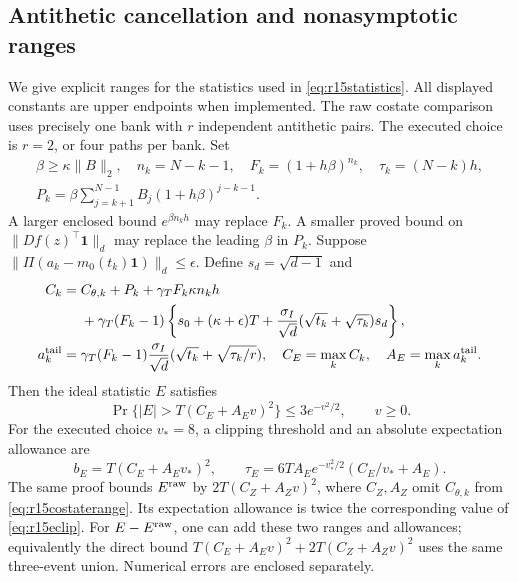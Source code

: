 \subsection{Antithetic cancellation and nonasymptotic ranges}
We give explicit ranges for the statistics used in
\eqref{eq:r15statistics}. All displayed constants are upper endpoints
when implemented. The raw costate comparison uses precisely one bank
with $r$ independent antithetic pairs. The executed choice is $r=2$,
or four paths per bank. Set
\[
 \begin{gathered}
 \beta\geq\kappa\|B\|_2,\quad n_k=N-k-1,\quad
 F_k=(1+h\beta)^{n_k},\quad\tau_k=(N-k)h,\\
 P_k=\beta\sum_{j=k+1}^{N-1}B_j(1+h\beta)^{j-k-1}.
 \end{gathered}
\]
A larger enclosed bound $e^{\beta n_kh}$ may replace $F_k$.
A smaller proved bound on $\|Df(z)^\top\bm1\|_d$ may replace the
leading $\beta$ in $P_k$. Suppose
$\|\Pi(a_k-m_0(t_k)\bm1)\|_d\leq\epsilon$.
Define $s_d=\sqrt{d-1}$ and
\begin{align}
 C_k={}&C_{\theta,k}+P_k+\gamma_TF_k\kappa n_kh\notag\\
 &+\gamma_T(F_k-1)\left\{s_0+(\kappa+\epsilon)T
             +\frac{\sigma_I}{\sqrt d}
                    (\sqrt{t_k}+\sqrt{\tau_k})s_d\right\},\notag\\
 a_k^{\rm tail}={}&\gamma_T(F_k-1)\frac{\sigma_I}{\sqrt d}
                       (\sqrt{t_k}+\sqrt{\tau_k/r}),
 \quad C_E=\max_k C_k,\quad A_E=\max_k a_k^{\rm tail}.
 \label{eq:r15costaterange}
\end{align}
Then the ideal statistic $E$ satisfies
\begin{equation}
 \Pr\{|E|>T(C_E+A_Ev)^2\}\leq3e^{-v^2/2},\qquad v\geq0.
 \label{eq:r15etail}
\end{equation}
For the executed choice $v_*=8$, a clipping threshold and an absolute
expectation allowance are
\begin{equation}
 b_E=T(C_E+A_Ev_*)^2,\qquad
 \tau_E=6TA_E e^{-v_*^2/2}(C_E/v_*+A_E).
 \label{eq:r15eclip}
\end{equation}
The same proof bounds $E^{\rm raw}$ by
$2T(C_Z+A_Zv)^2$, where $C_Z,A_Z$ omit $C_{\theta,k}$ from
\eqref{eq:r15costaterange}. Its expectation allowance is twice the
corresponding value of \eqref{eq:r15eclip}. For $E-E^{\rm raw}$,
one can add these two ranges and allowances; equivalently the direct
bound $T(C_E+A_Ev)^2+2T(C_Z+A_Zv)^2$ uses the same three-event
union. Numerical errors are enclosed separately.

